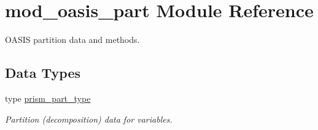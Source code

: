 \hypertarget{namespacemod__oasis__part}{}\section{mod\+\_\+oasis\+\_\+part Module Reference}
\label{namespacemod__oasis__part}


O\+A\+S\+IS partition data and methods.  


\subsection*{Data Types}
\begin{DoxyCompactItemize}
\item 
type \hyperlink{structmod__oasis__part_1_1prism__part__type}{prism\+\_\+part\+\_\+type}
\begin{DoxyCompactList}\small\item\em Partition (decomposition) data for variables. \end{DoxyCompactList}\end{DoxyCompactItemize}
